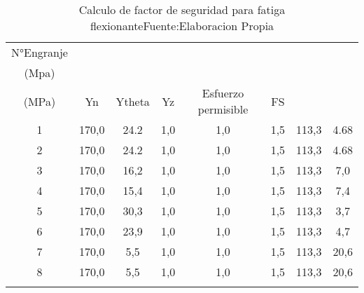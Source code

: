 



\begin{longtable}{|c|c|c|c|c|c|c|c|}
\hline
N°Engranje & \begin{tabular}[c]{@{}c@{}}St \\   (Mpa)\end{tabular} & \begin{tabular}[c]{@{}c@{}}Esfuerzo AGMA \\   (MPa)\end{tabular} & Yn  & Ytheta & Yz  & Esfuerzo permisible & FS   \\ \hline
1          & 170,0                                                 & 24.2                                                              & 1,0 & 1,0    & 1,5 & 113,3               & 4.68 \\ \hline
2          & 170,0                                                 & 24.2                                                              & 1,0 & 1,0    & 1,5 & 113,3               & 4.68 \\ \hline
3          & 170,0                                                 & 16,2                                                             & 1,0 & 1,0    & 1,5 & 113,3               & 7,0  \\ \hline
4          & 170,0                                                 & 15,4                                                             & 1,0 & 1,0    & 1,5 & 113,3               & 7,4  \\ \hline
5          & 170,0                                                 & 30,3                                                             & 1,0 & 1,0    & 1,5 & 113,3               & 3,7  \\ \hline
6          & 170,0                                                 & 23,9                                                             & 1,0 & 1,0    & 1,5 & 113,3               & 4,7  \\ \hline
7          & 170,0                                                 & 5,5                                                              & 1,0 & 1,0    & 1,5 & 113,3               & 20,6 \\ \hline
8          & 170,0                                                 & 5,5                                                              & 1,0 & 1,0    & 1,5 & 113,3               & 20,6 \\ \hline

\caption{{Calculo de factor de seguridad para fatiga flexionante}{Fuente:Elaboracion Propia}}

\label{table:fatiga-F_FS}
\end{longtable}















